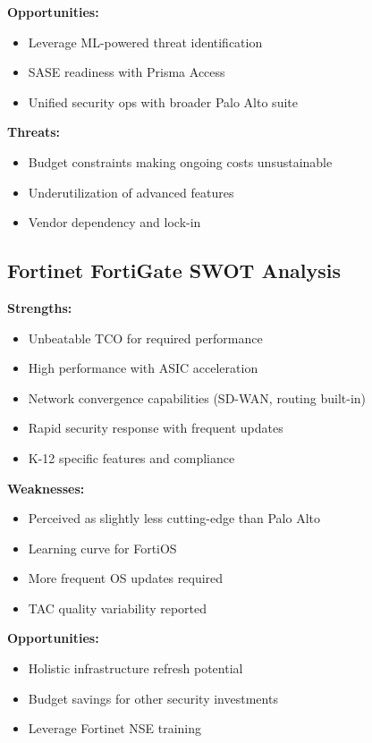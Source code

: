 \documentclass[12pt]{article}
\begin{document}
\textbf{Opportunities:}
\begin{itemize}
    \item Leverage ML-powered threat identification
    \item SASE readiness with Prisma Access
    \item Unified security ops with broader Palo Alto suite
\end{itemize}

\textbf{Threats:}
\begin{itemize}
    \item Budget constraints making ongoing costs unsustainable
    \item Underutilization of advanced features
    \item Vendor dependency and lock-in
\end{itemize}

\subsection{Fortinet FortiGate SWOT Analysis}

\textbf{Strengths:}
\begin{itemize}
    \item Unbeatable TCO for required performance \cite{comparisontable}
    \item High performance with ASIC acceleration \cite{fortigate201g}
    \item Network convergence capabilities (SD-WAN, routing built-in)
    \item Rapid security response with frequent updates
    \item K-12 specific features and compliance \cite{fortinetk12}
\end{itemize}

\textbf{Weaknesses:}
\begin{itemize}
    \item Perceived as slightly less cutting-edge than Palo Alto
    \item Learning curve for FortiOS
    \item More frequent OS updates required
    \item TAC quality variability reported
\end{itemize}

\textbf{Opportunities:}
\begin{itemize}
    \item Holistic infrastructure refresh potential
    \item Budget savings for other security investments
    \item Leverage Fortinet NSE training
\end{itemize}
\end{document}
